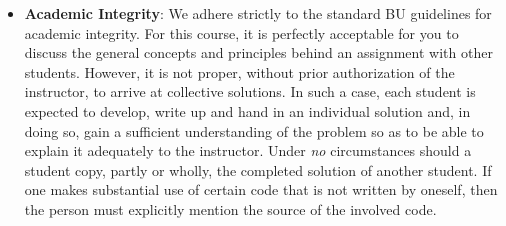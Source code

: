 \documentclass[11pt]{article}
\begin{document}
\begin{itemize}
Students remain responsible for everything they submit. In particular,
students must be able to:
\begin{itemize}
\item Explain submitted code.
\item Explain important design decisions.
\item Verify generated code.
\item Test generated code.
\item Identify incorrect or inappropriate generated solutions.
\item Consider security and maintainability implications.
\item Properly acknowledge AI assistance when required.
\end{itemize}
The fact that code was generated by an AI system is not evidence that
the code is correct.

The instructor may ask a student to explain any submitted code or
design. Inability to explain one's own submission may affect the
student's grade and, where appropriate, raise an academic-integrity
concern.

\item
{\bf Academic Integrity}:
We adhere strictly to the standard BU guidelines for academic
integrity. For this course, it is perfectly acceptable for you to discuss
the general concepts and principles behind an assignment with other
students. However, it is not proper, without prior authorization of the
instructor, to arrive at collective solutions. In such a case, each student
is expected to develop, write up and hand in an individual solution and, in
doing so, gain a sufficient understanding of the problem so as to be able
to explain it adequately to the instructor.  Under {\em no} circumstances
should a student copy, partly or wholly, the completed solution of another
student. If one makes substantial use of certain code that is not written by
oneself, then the person must explicitly mention the source of the involved
code.

\end{itemize}
\end{document}
